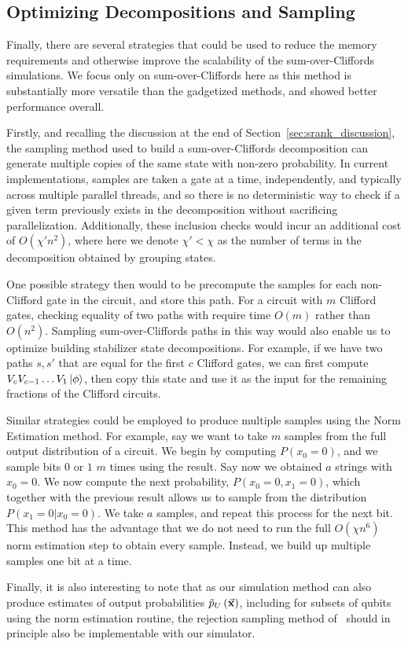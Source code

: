 \subsection{Optimizing Decompositions and Sampling}\label{sec:general_optimizations}
Finally, there are several strategies that could be used to reduce the memory requirements and otherwise improve the scalability of the sum-over-Cliffords simulations. We focus only on sum-over-Cliffords here as this method is substantially more versatile than the gadgetized methods, and showed better performance overall.\par
Firstly, and recalling the discussion at the end of Section~\ref{sec:srank_discussion}, the sampling method used to build a sum-over-Cliffords decomposition can generate multiple copies of the same state with non-zero probability. In current implementations, samples are taken a gate at a time, independently, and typically across multiple parallel threads, and so there is no deterministic way to check if a given term previously exists in the decomposition without sacrificing parallelization. Additionally, these inclusion checks would incur an additional cost of $O(\chi' n^{2})$, where here we denote $\chi' < \chi$ as the number of terms in the decomposition obtained by grouping states.\par
One possible strategy then would to be precompute the samples for each non-Clifford gate in the circuit, and store this path. For a circuit with $m$ Clifford gates, checking equality of two paths with require time $O(m)$ rather than $O(n^{2})$. Sampling sum-over-Cliffords paths in this way would also enable us to optimize building stabilizer state decompositions. For example, if we have two paths $s, s'$ that are equal for the first $c$ Clifford gates, we can first compute $V_{c}V_{c-1}\dots V_{1}\ket{\phi}$, then copy this state and use it as the input for the remaining fractions of the Clifford circuits.\par
Similar strategies could be employed to produce multiple samples using the Norm Estimation method. For example, say we want to take $m$ samples from the full output distribution of a circuit. We begin by computing $P(x_{0}=0)$, and we sample bits $0$ or $1$ $m$ times using the result. Say now we obtained $a$ strings with $x_{0}=0$. We now compute the next probability, $P\left(x_{0}=0,x_{1}=0\right)$, which together with the previous result allows us to sample from the distribution $P\left(x_{1}=0|x_{0}=0\right)$. We take $a$ samples, and repeat this process for the next bit. This method has the advantage that we do not need to run the full $O\left(\chi n^{6}\right)$ norm estimation step to obtain every sample. Instead, we build up multiple samples one bit at a time.\par
Finally, it is also interesting to note that as our simulation method can also produce estimates of output probabilities $\tilde{p}_{U}\left(\va{x}\right)$, including for subsets of qubits using the norm estimation routine, the rejection sampling method of~\cite{Villalonga2018} should in principle also be implementable with our simulator.